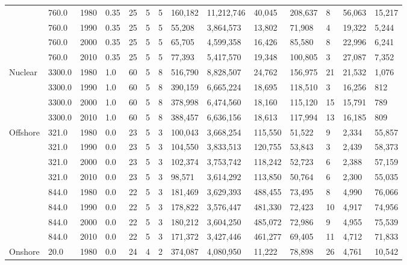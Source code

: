\documentclass[sigconf]{acmart}
\begin{document}
\begin{table}[]
\begin{tabular}{|l|l|l|l|l|l|l|l|l|l|l|l|l|l|}
		& 760.0 & 1980 & 0.35 & 25 & 5 & 5 & 160,182 & 11,212,746 & 40,045 & 208,637 & 8 & 56,063 & 15,217 \\ \cline{2-14} 
		& 760.0 & 1990 & 0.35 & 25 & 5 & 5 & 55,208 & 3,864,573 & 13,802 & 71,908 & 4 & 19,322 & 5,244 \\ \cline{2-14} 
		& 760.0 & 2000 & 0.35 & 25 & 5 & 5 & 65,705 & 4,599,358 & 16,426 & 85,580 & 8 & 22,996 & 6,241 \\ \cline{2-14} 
		& 760.0 & 2010 & 0.35 & 25 & 5 & 5 & 77,393 & 5,417,570 & 19,348 & 100,805 & 3 & 27,087 & 7,352 \\ \hline
		\multirow{4}{*}{Nuclear} & 3300.0 & 1980 & 1.0 & 60 & 5 & 8 & 516,790 & 8,828,507 & 24,762 & 156,975 & 21 & 21,532 & 1,076 \\ \cline{2-14} 
		& 3300.0 & 1990 & 1.0 & 60 & 5 & 8 & 390,159 & 6,665,224 & 18,695 & 118,510 & 3 & 16,256 & 812 \\ \cline{2-14} 
		& 3300.0 & 2000 & 1.0 & 60 & 5 & 8 & 378,998 & 6,474,560 & 18,160 & 115,120 & 15 & 15,791 & 789 \\ \cline{2-14} 
		& 3300.0 & 2010 & 1.0 & 60 & 5 & 8 & 388,457 & 6,636,156 & 18,613 & 117,994 & 13 & 16,185 & 809 \\ \hline
		\multirow{8}{*}{Offshore} & 321.0 & 1980 & 0.0 & 23 & 5 & 3 & 100,043 & 3,668,254 & 115,550 & 51,522 & 9 & 2,334 & 55,857 \\ \cline{2-14} 
		& 321.0 & 1990 & 0.0 & 23 & 5 & 3 & 104,550 & 3,833,513 & 120,755 & 53,843 & 3 & 2,439 & 58,373 \\ \cline{2-14} 
		& 321.0 & 2000 & 0.0 & 23 & 5 & 3 & 102,374 & 3,753,742 & 118,242 & 52,723 & 6 & 2,388 & 57,159 \\ \cline{2-14} 
		& 321.0 & 2010 & 0.0 & 23 & 5 & 3 & 98,571 & 3,614,292 & 113,850 & 50,764 & 6 & 2,300 & 55,035 \\ \cline{2-14} 
		& 844.0 & 1980 & 0.0 & 22 & 5 & 3 & 181,469 & 3,629,393 & 488,455 & 73,495 & 8 & 4,990 & 76,066 \\ \cline{2-14} 
		& 844.0 & 1990 & 0.0 & 22 & 5 & 3 & 178,822 & 3,576,447 & 481,330 & 72,423 & 10 & 4,917 & 74,956 \\ \cline{2-14} 
		& 844.0 & 2000 & 0.0 & 22 & 5 & 3 & 180,212 & 3,604,250 & 485,072 & 72,986 & 9 & 4,955 & 75,539 \\ \cline{2-14} 
		& 844.0 & 2010 & 0.0 & 22 & 5 & 3 & 171,372 & 3,427,446 & 461,277 & 69,405 & 11 & 4,712 & 71,833 \\ \hline
		\multirow{4}{*}{Onshore} & 20.0 & 1980 & 0.0 & 24 & 4 & 2 & 374,087 & 4,080,950 & 11,222 & 78,898 & 26 & 4,761 & 10,542 \\ \cline{2-14} 

\end{tabular}
\end{table}
\end{document}

